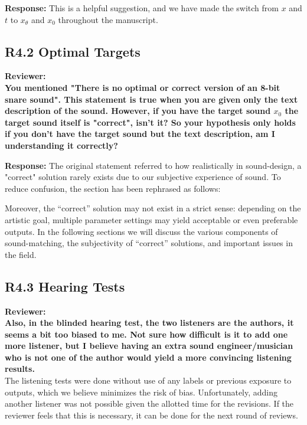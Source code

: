 \documentclass[11pt]{article}
\begin{document}
\noindent\textbf{Response:}
This is a helpful suggestion, and we have made the switch from $x$ and $t$ to $x_{\theta}$ and $x_0$ throughout the manuscript. 

\subsection{\textbf{R4.2} Optimal Targets}
\noindent\textbf{Reviewer:}\\
\textbf{You mentioned "There is no optimal or correct version of an 8-bit snare sound".
This statement is true when you are given only the text description of the sound. However, if you have the target sound $x_0$  the target sound itself is "correct", isn't it? So your hypothesis only holds if you don't have the target sound but the text description, am I understanding it correctly?\\}

\noindent\textbf{Response:}
The original statement referred to how realistically in sound-design, a "correct" solution rarely exists due to our subjective experience of sound. To reduce confusion, the section has been rephrased as follows:
\begin{displayquote}
    Moreover, the ``correct'' solution may not exist in a strict sense: depending on the artistic goal, multiple parameter settings may yield acceptable or even preferable outputs.  In the following sections we will discuss the various components of sound-matching, the subjectivity of ``correct'' solutions, and important issues in the field.
\end{displayquote}

\subsection{R4.3 Hearing Tests}
\label{}
\noindent\textbf{Reviewer:}\\
\textbf{Also, in the blinded hearing test, the two listeners are the authors, it seems a bit too biased to me. Not sure how difficult is it to add one more listener, but I believe having an extra sound engineer/musician who is not one of the author would yield a more convincing listening results.
}
\\

The listening tests were done without use of any labels or previous exposure to outputs, which we believe minimizes the risk of bias. Unfortunately, adding another listener was not possible given the allotted time for the revisions. If the reviewer feels that this is necessary, it can be done for the next round of reviews. 
\end{document}
